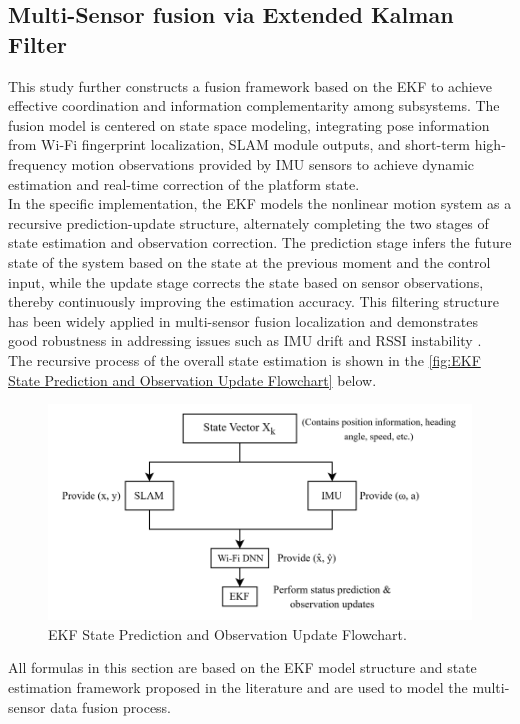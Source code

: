 \documentclass[12pt,a4paper]{article}
\numberwithin{equation}{section}
\begin{document}
\subsection{Multi-Sensor fusion via Extended Kalman Filter}
This study further constructs a fusion framework based on the EKF to achieve effective coordination and information complementarity among subsystems. The fusion model is centered on state space modeling, integrating pose information from Wi-Fi fingerprint localization, SLAM module outputs, and short-term high-frequency motion observations provided by IMU sensors to achieve dynamic estimation and real-time correction of the platform state.\\
In the specific implementation, the EKF models the nonlinear motion system as a recursive prediction-update structure, alternately completing the two stages of state estimation and observation correction. The prediction stage infers the future state of the system based on the state at the previous moment and the control input, while the update stage corrects the state based on sensor observations, thereby continuously improving the estimation accuracy. This filtering structure has been widely applied in multi-sensor fusion localization and demonstrates good robustness in addressing issues such as IMU drift and RSSI instability \cite{zhuang2023multi}.\\
The recursive process of the overall state estimation is shown in the \autoref{fig:EKF State Prediction and Observation Update Flowchart} below.
\begin{figure}[H]
    \centering
    \includegraphics[width=0.85\linewidth]{images/图片1.png}
    \caption{EKF State Prediction and Observation Update Flowchart.}
    \label{fig:EKF State Prediction and Observation Update Flowchart}
\end{figure}
\noindent All formulas in this section are based on the EKF model structure and state estimation framework proposed in the literature \cite{bailey2006consistency,lerro1993tracking,li2013high} and are used to model the multi-sensor data fusion process.\\
\end{document}

